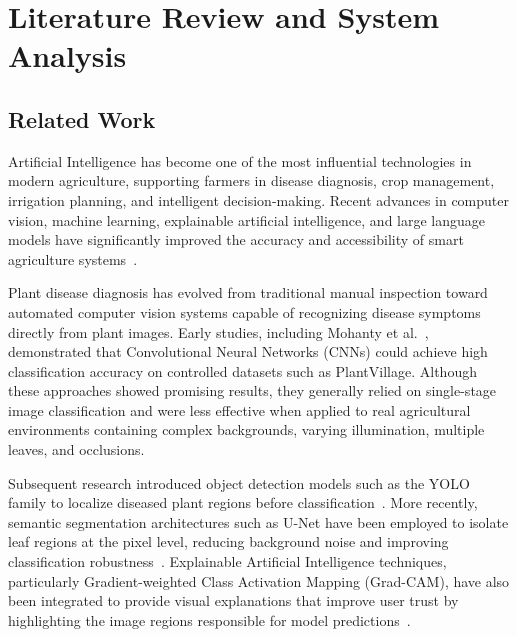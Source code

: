 
\chapter{Literature Review and System Analysis}
\label{chap:literature_review}


\section{Related Work}
\label{sec:related_work}

Artificial Intelligence has become one of the most influential technologies in modern agriculture, supporting farmers in disease diagnosis, crop management, irrigation planning, and intelligent decision-making. Recent advances in computer vision, machine learning, explainable artificial intelligence, and large language models have significantly improved the accuracy and accessibility of smart agriculture systems~\cite{goodfellow2016dl,szeliski2022cv,lewis2020rag}.

Plant disease diagnosis has evolved from traditional manual inspection toward automated computer vision systems capable of recognizing disease symptoms directly from plant images. Early studies, including Mohanty et al.~\cite{mohanty2016}, demonstrated that Convolutional Neural Networks (CNNs) could achieve high classification accuracy on controlled datasets such as PlantVillage. Although these approaches showed promising results, they generally relied on single-stage image classification and were less effective when applied to real agricultural environments containing complex backgrounds, varying illumination, multiple leaves, and occlusions.

Subsequent research introduced object detection models such as the YOLO family to localize diseased plant regions before classification~\cite{redmon2016yolo,jocher2023yolov8}. More recently, semantic segmentation architectures such as U-Net have been employed to isolate leaf regions at the pixel level, reducing background noise and improving classification robustness~\cite{ronneberger2015}. Explainable Artificial Intelligence techniques, particularly Gradient-weighted Class Activation Mapping (Grad-CAM), have also been integrated to provide visual explanations that improve user trust by highlighting the image regions responsible for model predictions~\cite{selvaraju2017gradcam}.

